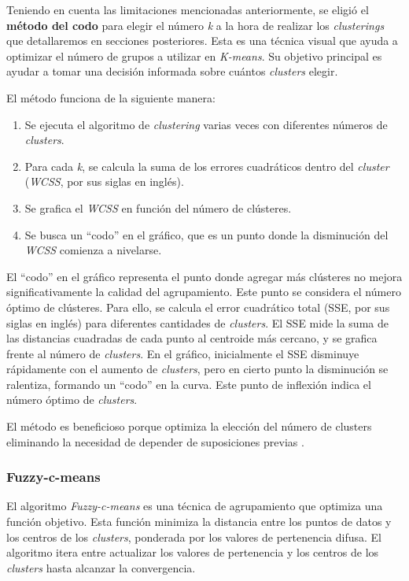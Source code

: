 \documentclass[11pt,a4paper,twoside,openany]{tesis}
\begin{document}
Teniendo en cuenta las limitaciones mencionadas anteriormente, se eligió el \textbf{método del codo} para elegir el número \emph{k} a la hora de realizar los \emph{clusterings} que detallaremos en secciones posteriores. Esta es una técnica visual que ayuda a optimizar el número de grupos a utilizar en \emph{K-means}. Su objetivo principal es ayudar a tomar una decisión informada sobre cuántos \emph{clusters} elegir.

El método funciona de la siguiente manera:
\begin{enumerate}
    \item Se ejecuta el algoritmo de \emph{clustering} varias veces con diferentes números de \emph{clusters}.
    \item Para cada \emph{k}, se calcula la suma de los errores cuadráticos dentro del \emph{cluster} (\emph{WCSS}, por sus siglas en inglés).
    \item Se grafica el \emph{WCSS} en función del número de clústeres.
    \item Se busca un ``codo'' en el gráfico, que es un punto donde la disminución del \emph{WCSS} comienza a nivelarse.
\end{enumerate}

El ``codo'' en el gráfico representa el punto donde agregar más clústeres no mejora significativamente la calidad del agrupamiento. Este punto se considera el número óptimo de clústeres. Para ello, se calcula el error cuadrático total (SSE, por sus siglas en inglés) para diferentes cantidades de \emph{clusters}. El SSE mide la suma de las distancias cuadradas de cada punto al centroide más cercano, y se grafica frente al número de \emph{clusters}. En el gráfico, inicialmente el SSE disminuye rápidamente con el aumento de \emph{clusters}, pero en cierto punto la disminución se ralentiza, formando un ``codo'' en la curva. Este punto de inflexión indica el número óptimo de \emph{clusters}.

El método es beneficioso porque optimiza la elección del número de clusters eliminando la necesidad de depender de suposiciones previas \cite{metodo-codo}.


\subsubsection{Fuzzy-c-means} \textbf{ }

El algoritmo \emph{Fuzzy-c-means} es una técnica de agrupamiento que optimiza una función objetivo. Esta función minimiza la distancia entre los puntos de datos y los centros de los \emph{clusters}, ponderada por los valores de pertenencia difusa. El algoritmo itera entre actualizar los valores de pertenencia y los centros de los \emph{clusters} hasta alcanzar la convergencia. 
\end{document}
